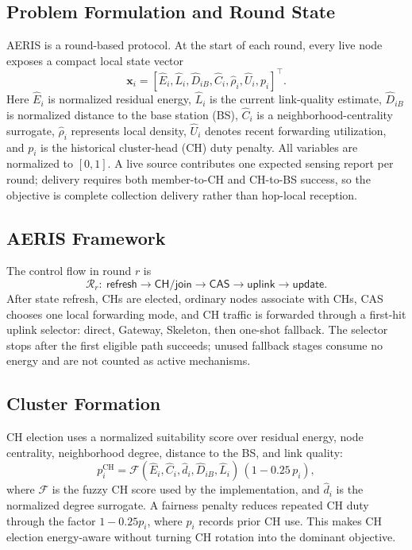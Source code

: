 \documentclass[conference]{IEEEtran}
\begin{document}
\subsection{Problem Formulation and Round State}
AERIS is a round-based protocol. At the start of each round, every live node exposes a compact local state vector
\begin{equation}
\mathbf{x}_i=[\hat{E}_i,\hat{L}_i,\hat{D}_{iB},\hat{C}_i,\hat{\rho}_i,\hat{U}_i,p_i]^\top .
\end{equation}
Here $\hat{E}_i$ is normalized residual energy, $\hat{L}_i$ is the current link-quality estimate, $\hat{D}_{iB}$ is normalized distance to the base station (BS), $\hat{C}_i$ is a neighborhood-centrality surrogate, $\hat{\rho}_i$ represents local density, $\hat{U}_i$ denotes recent forwarding utilization, and $p_i$ is the historical cluster-head (CH) duty penalty. All variables are normalized to $[0,1]$. A live source contributes one expected sensing report per round; delivery requires both member-to-CH and CH-to-BS success, so the objective is complete collection delivery rather than hop-local reception.

\subsection{AERIS Framework}
The control flow in round $r$ is
\begin{equation}
\mathcal{R}_r:\ \mathsf{refresh}\rightarrow\mathsf{CH/join}\rightarrow\mathsf{CAS}\rightarrow\mathsf{uplink}\rightarrow\mathsf{update}.
\end{equation}
After state refresh, CHs are elected, ordinary nodes associate with CHs, CAS chooses one local forwarding mode, and CH traffic is forwarded through a first-hit uplink selector: direct, Gateway, Skeleton, then one-shot fallback. The selector stops after the first eligible path succeeds; unused fallback stages consume no energy and are not counted as active mechanisms.

\subsection{Cluster Formation}
CH election uses a normalized suitability score over residual energy, node centrality, neighborhood degree, distance to the BS, and link quality:
\begin{equation}
p_i^{\mathrm{CH}}=\mathcal{F}(\hat{E}_i,\hat{C}_i,\hat{d}_i,\hat{D}_{iB},\hat{L}_i)\,(1-0.25\,p_i),
\end{equation}
where $\mathcal{F}$ is the fuzzy CH score used by the implementation, and $\hat{d}_i$ is the normalized degree surrogate. A fairness penalty reduces repeated CH duty through the factor $1-0.25p_i$, where $p_i$ records prior CH use. This makes CH election energy-aware without turning CH rotation into the dominant objective.
\end{document}
